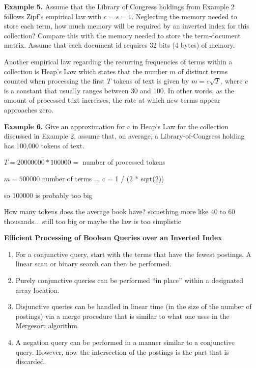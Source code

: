 \documentclass [12pt]{article}
\begin{document}
\textbf{Example 5.} Assume that the Library of Congress holdings from Example 2 follows
Zipf's empirical law with $c=s=1$. Neglecting the memory needed to store each term,
how much memory will be required by an inverted
index for this collection? Compare this with the memory needed to store the term-document 
matrix. Assume that each document id requires 32 bits (4 bytes) of memory.

\vspace{4.0in}
Another empirical law regarding the recurring frequencies of terms within a collection is Heap's Law which states
that the number $m$ of distinct terms counted when processing the first $T$ tokens of text is given by 
$m=c\sqrt{T}$, where $c$ is a constant that usually ranges between 30 and 100. In other words, as the amount of
processed text increases, the rate at which new terms appear approaches zero.

\vspace{2.5in}
\textbf{Example 6.} Give an approximation for $c$ in Heap's Law for the collection discussed in Example 2, assume that,
on average, a Library-of-Congress holding has 100,000 tokens of text.


$T = 20000000 * 100000 = $ number of processed tokens

$m = 500000$ number of terms 
...
c = 1 / (2 * sqrt(2))

so 100000 is probably too big

How many tokens does the average book have? something more like 40 to 60 thousands...
still too big or maybe the law is too simplistic

\newpage
\vspace{3.5in}
\textbf{Efficient Processing of Boolean Queries over an Inverted Index}

\begin{enumerate}
\item For a conjunctive query, start with the terms that have the fewest postings. 
A linear scan or binary search can then be performed.
\item Purely conjunctive queries can be performed ``in place'' within a designated array
location.
\item Disjunctive queries can be handled in linear time (in the size of the number of postings)
via a merge procedure that is similar to what one uses in the Mergesort algorithm.
\item A negation query can be performed in a manner similar to a conjunctive query. However, now
the intersection of the postings is the part that is discarded.
\end{enumerate}
\end{document}
